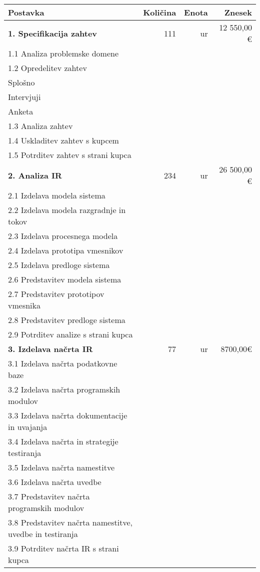 \documentclass{invoice} %
\def \tab {\hspace*{3ex}} %
\def \ttab {\hspace*{12ex}}
\begin{document}
\begin{center}
    \begin{longtable}{@{\extracolsep{\fill}\hspace{\tabcolsep}} l r r r }
        \hline
        \textbf{Postavka} & \textbf{Količina} & \textbf{Enota} & \textbf{Znesek}\\
        \hline
        \textbf{1. Specifikacija zahtev} & 111 & ur & 12 550,00 \euro\\
            \tab1.1 Analiza problemske domene\\
            \tab1.2 Opredelitev zahtev\tab\\
                \ttab Splošno\\
                \ttab Intervjuji\\
                \ttab Anketa\\
            \tab1.3 Analiza zahtev\\
            \tab1.4 Uskladitev zahtev s kupcem\\
            \tab1.5 Potrditev zahtev s strani kupca\\

        \textbf{2. Analiza IR} & 234 & ur & 26 500,00 \euro\\
            \tab2.1 Izdelava modela sistema\\
            \tab2.2 Izdelava modela razgradnje in tokov\\
            \tab2.3 Izdelava procesnega modela\\
            \tab2.4 Izdelava prototipa vmesnikov\\
            \tab2.5 Izdelava predloge sistema\\
            \tab2.6 Predstavitev modela sistema\\
            \tab2.7 Predstavitev prototipov vmesnika\\
            \tab2.8 Predstavitev predloge sistema\\
            \tab2.9 Potrditev analize s strani kupca\\

        \textbf{3. Izdelava načrta IR} & 77 & ur & 8700,00\euro\\
            \tab3.1 Izdelava načrta podatkovne baze\\
            \tab3.2 Izdelava načrta programskih modulov\\
            \tab3.3 Izdelava načrta dokumentacije in uvajanja\\
            \tab3.4 Izdelava načrta in strategije testiranja\\
            \tab3.5 Izdelava načrta namestitve\\
            \tab3.6 Izdelava načrta uvedbe\\
            \tab3.7 Predstavitev načrta programskih modulov\\
            \tab3.8 Predstavitev načrta namestitve, uvedbe in testiranja\\
            \tab3.9 Potrditev načrta IR s strani kupca\\


\end{longtable}
\end{center}
\end{document}
